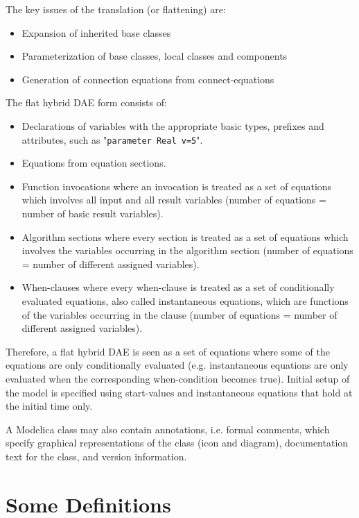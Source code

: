 The key issues of the translation (or flattening) are:

\begin{itemize}
\item
  Expansion of inherited base classes
\item
  Parameterization of base classes, local classes and components
\item
  Generation of connection equations from connect-equations
\end{itemize}

The flat hybrid DAE form consists of:

\begin{itemize}
\item
  Declarations of variables with the appropriate basic types, prefixes
  and attributes, such as "\lstinline!parameter Real v=5!".
\item
  Equations from equation sections.
\item
  Function invocations where an invocation is treated as a set of
  equations which involves all input and all result variables (number of
  equations = number of basic result variables).
\item
  Algorithm sections where every section is treated as a set of
  equations which involves the variables occurring in the algorithm
  section (number of equations = number of different assigned
  variables).
\item
  When-clauses where every when-clause is treated as a set of
  conditionally evaluated equations, also called instantaneous
  equations, which are functions of the variables occurring in the
  clause (number of equations = number of different assigned variables).
\end{itemize}

Therefore, a flat hybrid DAE is seen as a set of equations where some of
the equations are only conditionally evaluated (e.g. instantaneous
equations are only evaluated when the corresponding when-condition
becomes true). Initial setup of the model is specified using
start-values and instantaneous equations that hold at the initial time
only.

A Modelica class may also contain annotations, i.e. formal comments,
which specify graphical representations of the class (icon and diagram),
documentation text for the class, and version information.

\section{Some Definitions}

